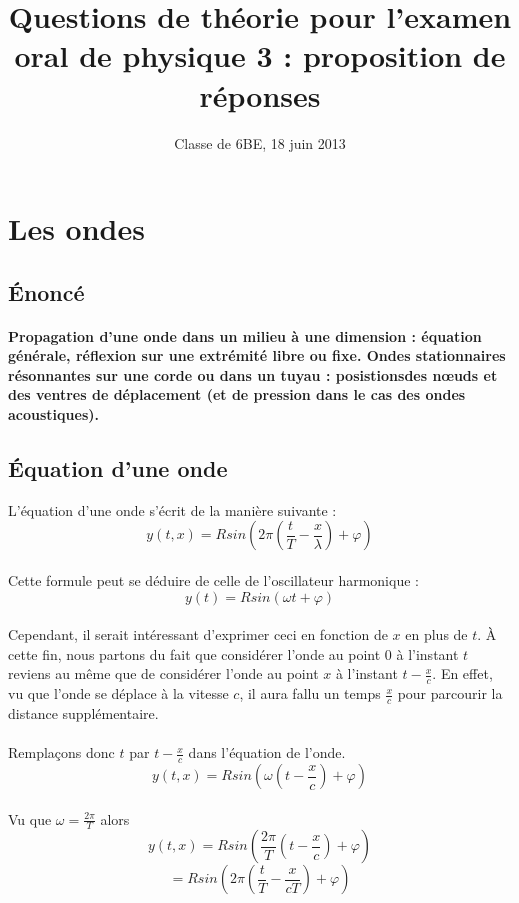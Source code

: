 \documentclass[a4paper]{article}
\title{Questions de théorie pour l'examen oral de physique 3 : proposition de réponses}
\date{Classe de 6BE, 18 juin 2013}
\author{}
\begin{document}
\maketitle
\section{Les ondes}
\subsection{Énoncé}
\paragraph{}\textbf{Propagation d'une onde dans un milieu à une dimension : équation générale, réflexion sur une extrémité libre ou fixe. Ondes stationnaires résonnantes sur une corde ou dans un tuyau : posistionsdes nœuds et des ventres de déplacement (et de pression dans le cas des ondes acoustiques).}
\subsection{Équation d'une onde}
L'équation d'une onde s'écrit de la manière suivante :
\[y(t,x)=Rsin\left(2\pi\left(\frac{t}{T}-\frac{x}{\lambda}\right)+\varphi\right)\]
\paragraph{}Cette formule peut se déduire de celle de l'oscillateur harmonique :
\[y(t)=Rsin(\omega t+\varphi)\]
\paragraph{}Cependant, il serait intéressant d'exprimer ceci en fonction de $x$ en plus de $t$. À cette fin, nous partons du fait que considérer l'onde au point $0$ à l'instant $t$ reviens au même que de considérer l'onde au point $x$ à l'instant $t-\frac{x}{c}$. En effet, vu que l'onde se déplace à la vitesse $c$, il aura fallu un temps $\frac{x}{c}$ pour parcourir la distance supplémentaire.
\paragraph{}Remplaçons donc $t$ par $t-\frac{x}{c}$ dans l'équation de l'onde.
\[y(t,x)=Rsin\left(\omega \left(t-\frac{x}{c}\right)+\varphi\right)\]
\paragraph{}Vu que $\omega=\frac{2\pi}{T}$ alors
\[y(t,x)=Rsin\left(\frac{2\pi}{T} \left(t-\frac{x}{c}\right)+\varphi\right)\]
\[=Rsin\left(2\pi \left(\frac{t}{T}-\frac{x}{cT}\right)+\varphi\right)\]
\end{document}
